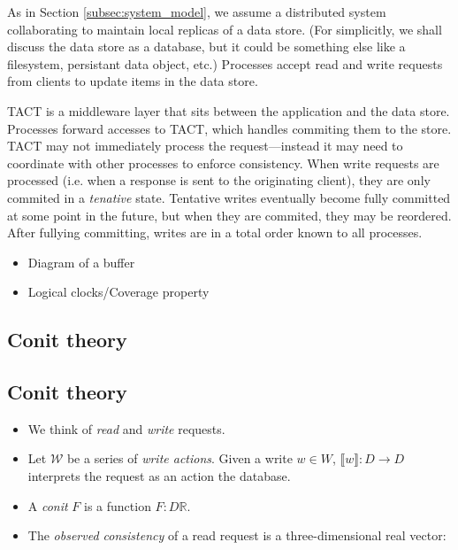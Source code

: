 As in Section \ref{subsec:system_model}, we assume a distributed
system collaborating to maintain local replicas of a data store. (For
simplicitly, we shall discuss the data store as a database, but it
could be something else like a filesystem, persistant data object,
etc.) Processes accept read and write requests from clients to update
items in the data store.

TACT is a middleware layer that sits between the application and the
data store. Processes forward accesses to TACT, which handles
commiting them to the store. TACT may not immediately process the
request---instead it may need to coordinate with other processes to
enforce consistency. When write requests are processed (i.e. when a
response is sent to the originating client), they are only commited in
a \emph{tenative} state. Tentative writes eventually become fully
committed at some point in the future, but when they are commited,
they may be reordered. After fullying committing, writes are in a
total order known to all processes.

\begin{itemize}
\item Diagram of a buffer
\item Logical clocks/Coverage property
\end{itemize}

\subsection{Conit theory}

\subsection{Conit theory}

\begin{itemize}

  \item We think of \emph{read} and \emph{write} requests.

  \item Let $\mathcal{W}$ be a series of \emph{write actions}. Given a write $w \in W$, $\llbracket w \rrbracket : D \to D$ interprets the request as an action the database.

  \item A \emph{conit} $F$ is a function $F : D \mathbb{R}$.

  \item The \emph{observed consistency} of a read request is a three-dimensional real vector:

\end{itemize}

